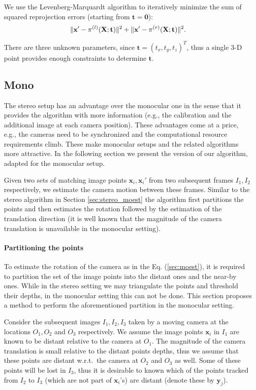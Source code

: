 We use the Levenberg-Marquardt algorithm to iteratively minimize the
sum of squared reprojection errors (starting from
$\mathbf{t}=\mathbf{0}$):
\begin{equation}
\lVert\mathbf{x'} - \pi^{(l)}(\mathbf{X};\mathbf{t})\rVert^2 + \lVert\mathbf{x'} - \pi^{(r)}(\mathbf{X};\mathbf{t})\rVert^2.
\end{equation}

There are three unknown parameters, since
$\mathbf{t} = (t_x,t_y,t_z)^T$, thus a single 3-D point provides
enough constraints to determine $\mathbf{t}$.

\subsection{Mono}\label{sec:mono_moest}

The stereo setup has an advantage over the monocular one in the sense
that it provides the algorithm with more information (e.g., the
calibration and the additional image at each camera position).  These
advantages come at a price, e.g., the cameras need to be synchronized
and the computational resource requirements climb.  These make
monocular setups and the related algorithms more attractive.  In the
following section we present the version of our algorithm, adapted for
the monocular setup.

Given two sets of matching image points $\mathbf{x}_i, \mathbf{x}_i'$
from two subsequent frames $I_1, I_2$ respectively, we estimate the
camera motion between these frames. Similar to the stereo algorithm in
Section \ref{sec:stereo_moest} the algorithm first partitions the
points and then estimates the rotation followed by the estimation of
the translation direction (it is well known that the magnitude of the
camera translation is unavailable in the monocular setting).

\paragraph{Partitioning the points} \label{sec:mono_split} To estimate
the rotation of the camera as in the Eq. (\ref{sec:moest}), it is
required to partition the set of the image points into the distant
ones and the near-by ones.  While in the stereo setting we may
triangulate the points and threshold their depths, in the monocular
setting this can not be done.  This section proposes a method to
perform the aforementioned partition in the monocular setting.

Consider the subsequent images $I_1, I_2, I_3$ taken by a moving
camera at the locations $O_1,O_2$ and $O_3$ respectively. We assume
the image points $\mathbf{x}_i$ in $I_1$ are known to be distant
relative to the camera at $O_1$.  The magnitude of the camera
translation is small relative to the distant points depths, thus we
assume that these points are distant w.r.t.\ the camera at $O_2$ and
$O_3$ as well.  Some of these points will be lost in $I_3$, thus it is
desirable to known which of the points tracked from $I_2$ to $I_3$
(which are not part of $\mathbf{x}_i$'s) are distant (denote these by
$\mathbf{y}_j$).

